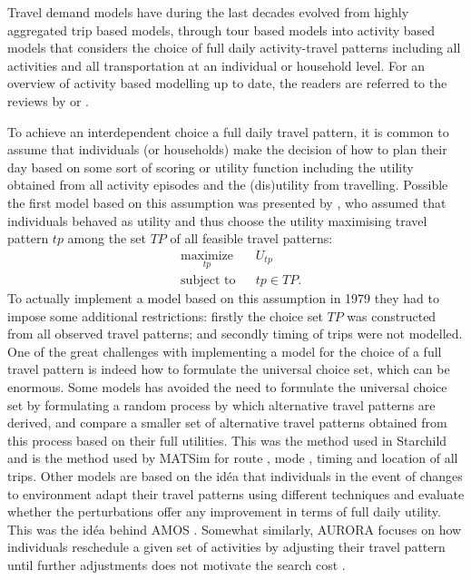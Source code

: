 Travel demand models have during the last decades evolved from highly aggregated trip based models, through tour based models into activity based models that considers the choice of full daily activity-travel patterns including all activities and all transportation at an individual or household level. For an overview of activity based modelling up to date, the readers are referred to the reviews by \citet{Pinjari11} or \citet{Rasouli14}.

To achieve an interdependent choice a full daily travel pattern, it is common to assume that individuals (or households) make the decision of how to plan their day based on some sort of scoring or utility function including the utility obtained from all activity episodes and the (dis)utility from travelling. Possible the first model based on this assumption was presented by \citet{Adler79}, who assumed that individuals behaved as utility and thus choose the utility maximising travel pattern $tp$ among the set $TP$ of all feasible travel patterns:
\begin{equation}
\label{eq:opt}
	\begin{aligned}
	& \underset{tp}{\text{maximize}}
	& & U_{tp} \\
	& \text{subject to}
	& & tp \in TP.
\end{aligned}
\end{equation}
To actually implement a model based on this assumption in 1979 they had to impose some additional restrictions: firstly the choice set $TP$ was constructed from all observed travel patterns; and secondly timing of trips were not modelled. One of the great challenges with implementing a model for the choice of a full travel pattern is indeed how to formulate the universal choice set, which can be enormous. Some models has avoided the need to formulate the universal choice set by formulating a random process by which alternative travel patterns are derived, and compare a smaller set of alternative travel patterns obtained from this process based on their full utilities. This was the method used in Starchild \citet{recker86starchild1,recker86starchild2} and is the method used by MATSim for route \citep{lefebvre2007fast}, mode \citep{grether2009mode}, timing \citep{balmer05} and location \citep{horni2011} of all trips. Other models are based on the idéa that individuals in the event of changes to environment adapt their travel patterns using different techniques and evaluate whether the perturbations offer any improvement in terms of full daily utility. This was the idéa behind AMOS \citep{kitamura1996Sams}. Somewhat similarly, AURORA focuses on how individuals reschedule a given set of activities by adjusting their travel pattern until further adjustments does not motivate the search cost \citep{timmermans2001modeling,joh2003Aurora, johEstimationAurora2005}.


